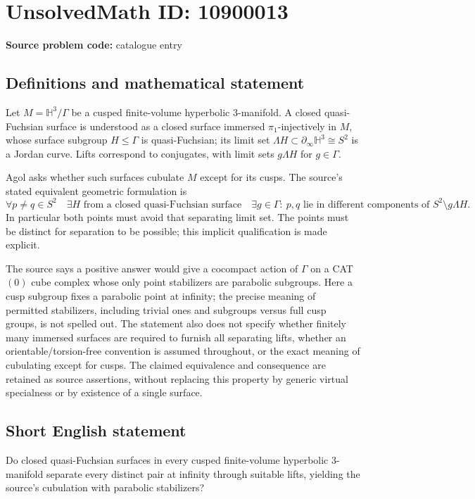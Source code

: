 \documentclass[11pt]{article}
\begin{document}
\section*{UnsolvedMath ID: 10900013}
\textbf{Source problem code:} catalogue entry
\subsection{Definitions and mathematical statement}
Let \(M=\mathbb H^3/\Gamma\) be a cusped finite-volume hyperbolic \(3\)-manifold. A closed quasi-Fuchsian surface is understood as a closed surface immersed \(\pi_1\)-injectively in \(M\), whose surface subgroup \(H\leq\Gamma\) is quasi-Fuchsian; its limit set \(\Lambda H\subset\partial_\infty\mathbb H^3\cong S^2\) is a Jordan curve. Lifts correspond to conjugates, with limit sets \(g\Lambda H\) for \(g\in\Gamma\).

Agol asks whether such surfaces cubulate \(M\) except for its cusps. The source's stated equivalent geometric formulation is
\[
 \forall p\ne q\in S^2\quad\exists H\text{ from a closed quasi-Fuchsian surface}
 \quad\exists g\in\Gamma:
 \ p,q\text{ lie in different components of }S^2\setminus g\Lambda H.
\]
In particular both points must avoid that separating limit set. The points must be distinct for separation to be possible; this implicit qualification is made explicit.

The source says a positive answer would give a cocompact action of \(\Gamma\) on a CAT\((0)\) cube complex whose only point stabilizers are parabolic subgroups. Here a cusp subgroup fixes a parabolic point at infinity; the precise meaning of permitted stabilizers, including trivial ones and subgroups versus full cusp groups, is not spelled out. The statement also does not specify whether finitely many immersed surfaces are required to furnish all separating lifts, whether an orientable/torsion-free convention is assumed throughout, or the exact meaning of cubulating except for cusps. The claimed equivalence and consequence are retained as source assertions, without replacing this property by generic virtual specialness or by existence of a single surface.
\subsection{Short English statement}
Do closed quasi-Fuchsian surfaces in every cusped finite-volume hyperbolic \(3\)-manifold separate every distinct pair at infinity through suitable lifts, yielding the source's cubulation with parabolic stabilizers?
\end{document}
